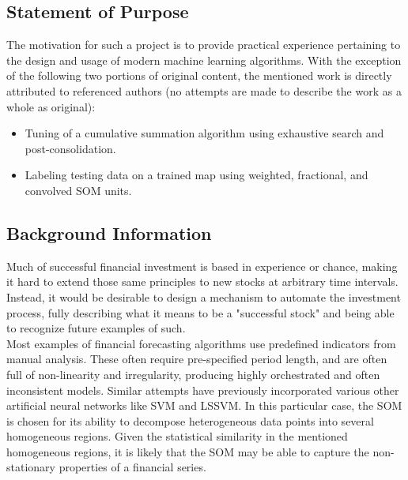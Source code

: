 \documentclass[preprint,12pt]{elsarticle}
\begin{document}
\subsection{Statement of Purpose}
The motivation for such a project is to provide practical experience pertaining to the design and usage of modern machine learning algorithms. With the exception of the following two portions of original content, the mentioned work is directly attributed to referenced authors (no attempts are made to describe the work as a whole as original):
	\begin{itemize}
    	\item Tuning of a cumulative summation algorithm using exhaustive search and post-consolidation.
        \item Labeling testing data on a trained map using weighted, fractional, and convolved SOM units.  
    \end{itemize}

\subsection{Background Information}
Much of successful financial investment is based in experience or chance, making it hard to extend those same principles to new stocks at arbitrary time intervals. Instead, it would be desirable to design a mechanism to automate the investment process, fully describing what it means to be a "successful stock" and being able to recognize future examples of such.\\

Most examples of financial forecasting algorithms use predefined indicators from manual analysis. These often require pre-specified period length, and are often full of non-linearity and irregularity, producing highly orchestrated and often inconsistent models. Similar attempts have previously incorporated various other artificial neural networks like SVM and LSSVM. In this particular case, the SOM is chosen for its ability to decompose heterogeneous data points into several homogeneous regions. Given the statistical similarity in the mentioned homogeneous regions, it is likely that the SOM may be able to capture the non-stationary properties of a financial series. 

\end{document}
